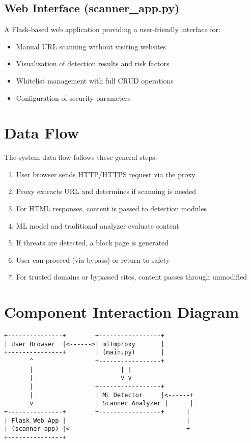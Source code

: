 \subsection{Web Interface (scanner\_app.py)}
A Flask-based web application providing a user-friendly interface for:
\begin{itemize}
    \item Manual URL scanning without visiting websites
    \item Visualization of detection results and risk factors
    \item Whitelist management with full CRUD operations
    \item Configuration of security parameters
\end{itemize}

\section{Data Flow}

The system data flow follows these general steps:

\begin{enumerate}
    \item User browser sends HTTP/HTTPS request via the proxy
    \item Proxy extracts URL and determines if scanning is needed
    \item For HTML responses, content is passed to detection modules
    \item ML model and traditional analyzer evaluate content
    \item If threats are detected, a block page is generated
    \item User can proceed (via bypass) or return to safety
    \item For trusted domains or bypassed sites, content passes through unmodified
\end{enumerate}

\section{Component Interaction Diagram}

\begin{verbatim}
+---------------+        +-----------------+
| User Browser  |<------>| mitmproxy       |
+---------------+        | (main.py)       |
       ^                 +-----------------+
       |                        | |
       |                        v v
       |                 +-----------------+
       |                 | ML Detector     |<------+
       v                 | Scanner Analyzer |      |
+---------------+        +-----------------+      |
| Flask Web App |                                 |
| (scanner_app) |<--------------------------------+
+---------------+
\end{verbatim}

